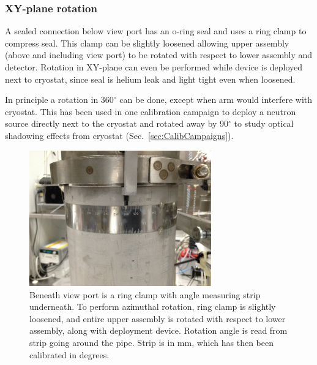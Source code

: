 \subsubsection{XY-plane rotation}\label{sec:XYrotation}
A sealed connection below view port has an o-ring seal and uses a ring clamp to compress seal. This clamp can be slightly loosened allowing upper assembly (above and including view port) to be rotated with respect to lower assembly and detector. Rotation in XY-plane can even be performed while device is deployed next to cryostat, since seal is helium leak and light tight even when loosened.

In principle a rotation in 360$^\circ$ can be done, except when arm would interfere with cryostat. This has been used in one calibration campaign to deploy a neutron source directly next to the cryostat and rotated away by 90$^\circ$ to study optical shadowing effects from cryostat (Sec.~\ref{sec:CalibCampaigns}). 





\begin{figure}[htbp]
 \centering
  \includegraphics[width=0.7\textwidth]{Figures/RingClamp_WithPin_IMG_2669.JPG}
  \caption{Beneath view port is a ring clamp with angle measuring strip underneath. To perform azimuthal rotation, ring clamp is slightly loosened, and entire upper assembly is rotated with respect to lower assembly, along with deployment device. Rotation angle is read from strip going around the pipe. Strip is in mm, which has then been calibrated in degrees.}
  \label{fig:ring_clamp}
\end{figure} 

